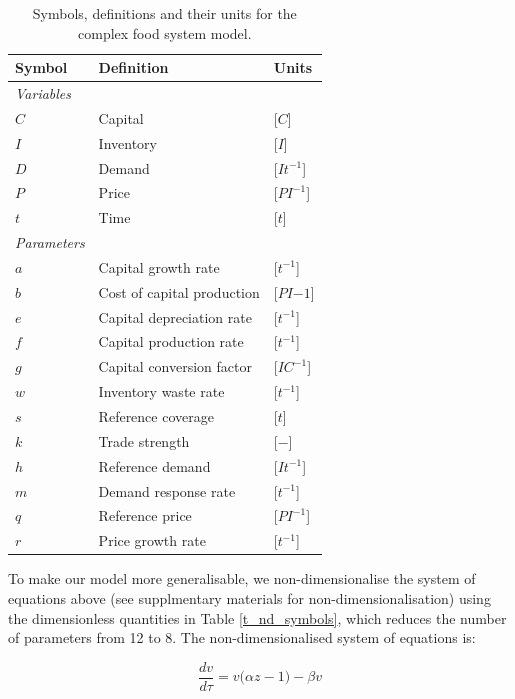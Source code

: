 \documentclass[12pt]{article}
\begin{document}
\begin{table}[t!]
  \centering
  \footnotesize
  \begin{tabular}{p{2cm}p{5cm}p{2cm}}
    \textbf{Symbol} & \textbf{Definition} & \textbf{Units} \\ \hline
    \textit{Variables} &&\\
    $C$    & Capital             & [$C$]\\
    $I$    & Inventory           & [$I$]\\
    $D$    & Demand              & [$It^{-1}$]\\
    $P$    & Price               & [$PI^{-1}$]\\
    $t$    & Time                & [$t$]\\
    \textit{Parameters} &&\\
    $a$    & Capital growth rate & [$t^{-1}$]\\
    $b$    & Cost of capital production & [$PI{-1}$]\\
    $e$    & Capital depreciation rate & [$t^{-1}$]\\
    $f$    & Capital production rate & [$t^{-1}$]\\
    $g$    & Capital conversion factor & [$IC^{-1}$]\\
    $w$    & Inventory waste rate     & [$t^{-1}$]\\
    $s$    & Reference coverage       & [$t$]\\
    $k$    & Trade strength        & [$-$]\\
    $h$    & Reference demand         & [$It^{-1}$]\\
    $m$    & Demand response rate     & [$t^{-1}$]\\
    $q$    & Reference price          & [$PI^{-1}$]\\
    $r$    & Price growth rate        & [$t^{-1}$]\\\hline
  \end{tabular}
  \caption{Symbols, definitions and their units for the complex food system model.}
  \label{t_symbols}
\end{table}

To make our model more generalisable, we non-dimensionalise the system of equations above (see supplmentary materials for non-dimensionalisation) using the dimensionless quantities in Table \ref{t_nd_symbols}, which reduces the number of parameters from 12 to 8. The non-dimensionalised system of equations is:

\begin{equation}
  \frac{dv}{d\tau} = v \Big(\alpha z - 1\Big) - \beta v
\end{equation}
\end{document}
